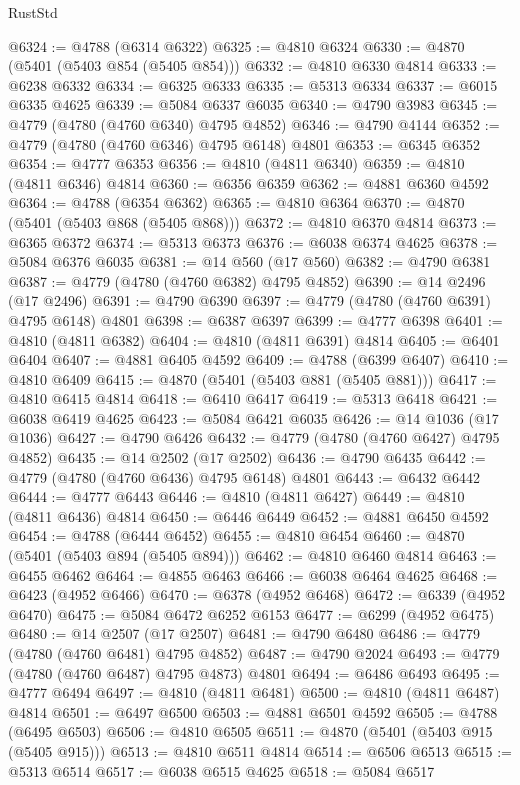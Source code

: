 \begin{lexlean}{RustStd}
\begin{coremodule}
@6324 := @4788 (@6314 @6322)
@6325 := @4810 @6324
@6330 := @4870 (@5401 (@5403 @854 (@5405 @854)))
@6332 := @4810 @6330 @4814
@6333 := @6238 @6332
@6334 := @6325 @6333
@6335 := @5313 @6334
@6337 := @6015 @6335 @4625
@6339 := @5084 @6337 @6035
@6340 := @4790 @3983
@6345 := @4779 (@4780 (@4760 @6340) @4795 @4852)
@6346 := @4790 @4144
@6352 := @4779 (@4780 (@4760 @6346) @4795 @6148) @4801
@6353 := @6345 @6352
@6354 := @4777 @6353
@6356 := @4810 (@4811 @6340)
@6359 := @4810 (@4811 @6346) @4814
@6360 := @6356 @6359
@6362 := @4881 @6360 @4592
@6364 := @4788 (@6354 @6362)
@6365 := @4810 @6364
@6370 := @4870 (@5401 (@5403 @868 (@5405 @868)))
@6372 := @4810 @6370 @4814
@6373 := @6365 @6372
@6374 := @5313 @6373
@6376 := @6038 @6374 @4625
@6378 := @5084 @6376 @6035
@6381 := @14 @560 (@17 @560)
@6382 := @4790 @6381
@6387 := @4779 (@4780 (@4760 @6382) @4795 @4852)
@6390 := @14 @2496 (@17 @2496)
@6391 := @4790 @6390
@6397 := @4779 (@4780 (@4760 @6391) @4795 @6148) @4801
@6398 := @6387 @6397
@6399 := @4777 @6398
@6401 := @4810 (@4811 @6382)
@6404 := @4810 (@4811 @6391) @4814
@6405 := @6401 @6404
@6407 := @4881 @6405 @4592
@6409 := @4788 (@6399 @6407)
@6410 := @4810 @6409
@6415 := @4870 (@5401 (@5403 @881 (@5405 @881)))
@6417 := @4810 @6415 @4814
@6418 := @6410 @6417
@6419 := @5313 @6418
@6421 := @6038 @6419 @4625
@6423 := @5084 @6421 @6035
@6426 := @14 @1036 (@17 @1036)
@6427 := @4790 @6426
@6432 := @4779 (@4780 (@4760 @6427) @4795 @4852)
@6435 := @14 @2502 (@17 @2502)
@6436 := @4790 @6435
@6442 := @4779 (@4780 (@4760 @6436) @4795 @6148) @4801
@6443 := @6432 @6442
@6444 := @4777 @6443
@6446 := @4810 (@4811 @6427)
@6449 := @4810 (@4811 @6436) @4814
@6450 := @6446 @6449
@6452 := @4881 @6450 @4592
@6454 := @4788 (@6444 @6452)
@6455 := @4810 @6454
@6460 := @4870 (@5401 (@5403 @894 (@5405 @894)))
@6462 := @4810 @6460 @4814
@6463 := @6455 @6462
@6464 := @4855 @6463
@6466 := @6038 @6464 @4625
@6468 := @6423 (@4952 @6466)
@6470 := @6378 (@4952 @6468)
@6472 := @6339 (@4952 @6470)
@6475 := @5084 @6472 @6252 @6153
@6477 := @6299 (@4952 @6475)
@6480 := @14 @2507 (@17 @2507)
@6481 := @4790 @6480
@6486 := @4779 (@4780 (@4760 @6481) @4795 @4852)
@6487 := @4790 @2024
@6493 := @4779 (@4780 (@4760 @6487) @4795 @4873) @4801
@6494 := @6486 @6493
@6495 := @4777 @6494
@6497 := @4810 (@4811 @6481)
@6500 := @4810 (@4811 @6487) @4814
@6501 := @6497 @6500
@6503 := @4881 @6501 @4592
@6505 := @4788 (@6495 @6503)
@6506 := @4810 @6505
@6511 := @4870 (@5401 (@5403 @915 (@5405 @915)))
@6513 := @4810 @6511 @4814
@6514 := @6506 @6513
@6515 := @5313 @6514
@6517 := @6038 @6515 @4625
@6518 := @5084 @6517

\end{coremodule}
\end{lexlean}
